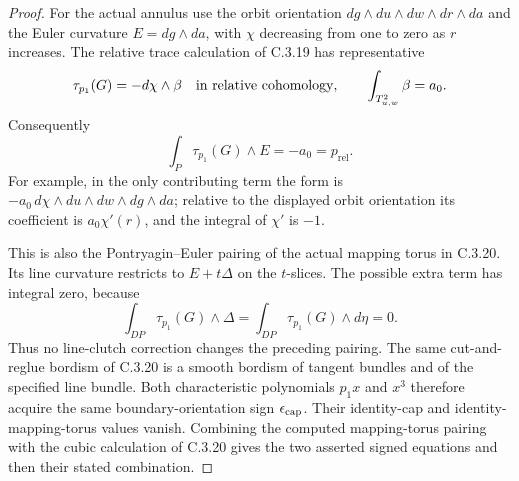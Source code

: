 \begin{proof}
For the actual annulus use the orbit orientation
$dg\wedge du\wedge dw\wedge dr\wedge da$ and the
Euler curvature $E=dg\wedge da$, with $\chi$ decreasing
from one to zero as $r$ increases. The relative trace
calculation of C.3.19 has representative
\[
 \tau_{p_1}(G)
 =-d\chi\wedge\beta
 \quad\hbox{in relative cohomology},
 \qquad
 \int_{T^2_{u,w}}\beta=a_0.
\]
Consequently
\[
 \int_P\tau_{p_1}(G)\wedge E=-a_0=p_{\mathrm{rel}}.
\]
For example, in the only contributing term the form is
$-a_0\,d\chi\wedge du\wedge dw\wedge dg\wedge da$;
relative to the displayed orbit orientation its coefficient
is $a_0\chi'(r)$, and the integral of $\chi'$ is $-1$.

This is also the Pontryagin--Euler pairing of the actual
mapping torus in C.3.20. Its line curvature restricts to
$E+t\Delta$ on the $t$-slices. The possible extra term
has integral zero, because
\[
 \int_{DP}\tau_{p_1}(G)\wedge\Delta
 =\int_{DP}\tau_{p_1}(G)\wedge d\eta=0.
\]
Thus no line-clutch correction changes the preceding
pairing. The same cut-and-reglue bordism of C.3.20 is a
smooth bordism of tangent bundles and of the specified
line bundle. Both characteristic polynomials $p_1x$
and $x^3$ therefore acquire the same boundary-orientation
sign $\epsilon_{\rm cap}$. Their identity-cap and
identity-mapping-torus values vanish. Combining the
computed mapping-torus pairing with the cubic calculation
of C.3.20 gives the two asserted signed equations and
then their stated combination.
\end{proof}
